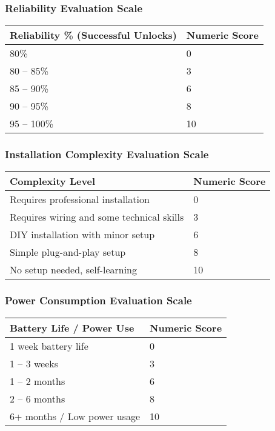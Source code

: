 \subsubsection{Reliability Evaluation Scale}
\begin{tabular}{ll}
    \toprule
    Reliability \% (Successful Unlocks) & Numeric Score \\
    \midrule
    80\% & 0 \\
    80 – 85\% & 3 \\
    85 – 90\% & 6 \\
    90 – 95\% & 8 \\
    95 – 100\% & 10 \\
    \bottomrule
\end{tabular}

\subsubsection{Installation Complexity Evaluation Scale}
\begin{tabular}{ll}
    \toprule
    Complexity Level & Numeric Score \\
    \midrule
    Requires professional installation & 0 \\
    Requires wiring and some technical skills & 3 \\
    DIY installation with minor setup & 6 \\
    Simple plug-and-play setup & 8 \\
    No setup needed, self-learning & 10 \\
    \bottomrule
\end{tabular}

\subsubsection{Power Consumption Evaluation Scale}
\begin{tabular}{ll}
    \toprule
    Battery Life / Power Use & Numeric Score \\
    \midrule
    1 week battery life & 0 \\
    1 – 3 weeks & 3 \\
    1 – 2 months & 6 \\
    2 – 6 months & 8 \\
    6+ months / Low power usage & 10 \\
    \bottomrule
\end{tabular}

